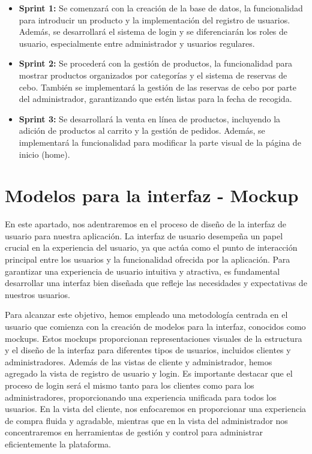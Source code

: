 \begin{itemize}
    \item \textbf{Sprint 1: }Se comenzará con la creación de la base de datos, la funcionalidad para introducir un producto y la implementación del registro de usuarios. Además, se desarrollará el sistema de login y se diferenciarán los roles de usuario, especialmente entre administrador y usuarios regulares.

    \item \textbf{Sprint 2: }Se procederá con la gestión de productos, la funcionalidad para mostrar productos organizados por categorías y el sistema de reservas de cebo. También se implementará la gestión de las reservas de cebo por parte del administrador, garantizando que estén listas para la fecha de recogida.
    
    \item \textbf{Sprint 3: }Se desarrollará la venta en línea de productos, incluyendo la adición de productos al carrito y la gestión de pedidos. Además, se implementará la funcionalidad para modificar la parte visual de la página de inicio (home).
    
\end{itemize}

\section{Modelos para la interfaz - Mockup}\label{sec:apartado}
En este apartado, nos adentraremos en el proceso de diseño de la interfaz de usuario para nuestra aplicación. La interfaz de usuario desempeña un papel crucial en la experiencia del usuario, ya que actúa como el punto de interacción principal entre los usuarios y la funcionalidad ofrecida por la aplicación. Para garantizar una experiencia de usuario intuitiva y atractiva, es fundamental desarrollar una interfaz bien diseñada que refleje las necesidades y expectativas de nuestros usuarios.

\vspace{0.5cm}

Para alcanzar este objetivo, hemos empleado una metodología centrada en el usuario que comienza con la creación de modelos para la interfaz, conocidos como mockups. Estos mockups proporcionan representaciones visuales de la estructura y el diseño de la interfaz para diferentes tipos de usuarios, incluidos clientes y administradores. Además de las vistas de cliente y administrador, hemos agregado la vista de registro de usuario y login. Es importante destacar que el proceso de login será el mismo tanto para los clientes como para los administradores, proporcionando una experiencia unificada para todos los usuarios. En la vista del cliente, nos enfocaremos en proporcionar una experiencia de compra fluida y agradable, mientras que en la vista del administrador nos concentraremos en herramientas de gestión y control para administrar eficientemente la plataforma.

